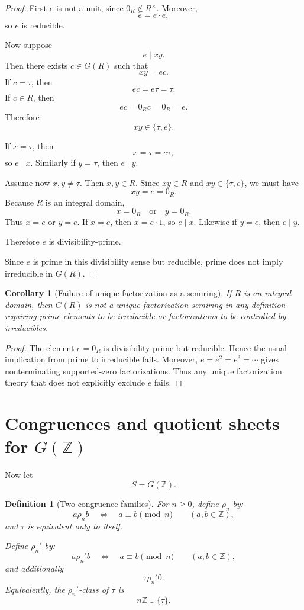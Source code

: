 \documentclass[11pt]{article}
\newtheorem{corollary}[theorem]{Corollary}
\newtheorem{definition}[theorem]{Definition}
\newcommand{\ZZ}{\mathbb Z}
\begin{document}
\begin{proof}
First \(e\) is not a unit, since \(0_R\notin R^\times\). Moreover,
\[
e=e\cdot e,
\]
so \(e\) is reducible.

Now suppose
\[
e\mid xy.
\]
Then there exists \(c\in G(R)\) such that
\[
xy=ec.
\]
If \(c=\tau\), then
\[
ec=e\tau=\tau.
\]
If \(c\in R\), then
\[
ec=0_Rc=0_R=e.
\]
Therefore
\[
xy\in\{\tau,e\}.
\]

If \(x=\tau\), then
\[
x=\tau=e\tau,
\]
so \(e\mid x\). Similarly if \(y=\tau\), then \(e\mid y\).

Assume now \(x,y\neq\tau\). Then \(x,y\in R\). Since \(xy\in R\) and \(xy\in\{\tau,e\}\), we must have
\[
xy=e=0_R.
\]
Because \(R\) is an integral domain,
\[
x=0_R
\quad\text{or}\quad
y=0_R.
\]
Thus \(x=e\) or \(y=e\). If \(x=e\), then \(x=e\cdot1\), so \(e\mid x\). Likewise if \(y=e\), then \(e\mid y\).

Therefore \(e\) is divisibility-prime.

Since \(e\) is prime in this divisibility sense but reducible, prime does not imply irreducible in \(G(R)\).
\end{proof}

\begin{corollary}[Failure of unique factorization as a semiring]
If \(R\) is an integral domain, then \(G(R)\) is not a unique factorization semiring in any definition requiring prime elements to be irreducible or factorizations to be controlled by irreducibles.
\end{corollary}

\begin{proof}
The element \(e=0_R\) is divisibility-prime but reducible. Hence the usual implication from prime to irreducible fails. Moreover, \(e=e^2=e^3=\cdots\) gives nonterminating supported-zero factorizations. Thus any unique factorization theory that does not explicitly exclude \(e\) fails.
\end{proof}

\section{Congruences and quotient sheets for \(G(\ZZ)\)}

Now let
\[
S=G(\ZZ).
\]

\begin{definition}[Two congruence families]
For \(n\ge0\), define \(\rho_n\) by:
\[
a\rho_n b
\quad\Longleftrightarrow\quad
a\equiv b\pmod n
\qquad(a,b\in\ZZ),
\]
and \(\tau\) is equivalent only to itself.

Define \(\rho_n'\) by:
\[
a\rho_n' b
\quad\Longleftrightarrow\quad
a\equiv b\pmod n
\qquad(a,b\in\ZZ),
\]
and additionally
\[
\tau\rho_n'0.
\]
Equivalently, the \(\rho_n'\)-class of \(\tau\) is
\[
n\ZZ\cup\{\tau\}.
\]
\end{definition}
\end{document}
